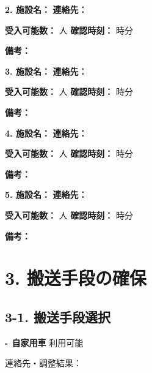 \documentclass[a4paper,12pt]{jarticle}
\newcommand{\checkbox}{$\square$\ }
\newcommand{\underlinespace}[1]{\underline{\hspace{#1}}}
\begin{document}
\vspace{4mm}

\textbf{2. 施設名：} \underlinespace{6cm} \quad \textbf{連絡先：} \underlinespace{4cm}

\quad \textbf{受入可能数：} \underlinespace{2cm}人 \quad \textbf{確認時刻：} \underlinespace{1cm}時\underlinespace{1cm}分

\quad \textbf{備考：} \underlinespace{10cm}

\vspace{4mm}

\textbf{3. 施設名：} \underlinespace{6cm} \quad \textbf{連絡先：} \underlinespace{4cm}

\quad \textbf{受入可能数：} \underlinespace{2cm}人 \quad \textbf{確認時刻：} \underlinespace{1cm}時\underlinespace{1cm}分

\quad \textbf{備考：} \underlinespace{10cm}

\vspace{4mm}

\textbf{4. 施設名：} \underlinespace{6cm} \quad \textbf{連絡先：} \underlinespace{4cm}

\quad \textbf{受入可能数：} \underlinespace{2cm}人 \quad \textbf{確認時刻：} \underlinespace{1cm}時\underlinespace{1cm}分

\quad \textbf{備考：} \underlinespace{10cm}

\vspace{4mm}

\textbf{5. 施設名：} \underlinespace{6cm} \quad \textbf{連絡先：} \underlinespace{4cm}

\quad \textbf{受入可能数：} \underlinespace{2cm}人 \quad \textbf{確認時刻：} \underlinespace{1cm}時\underlinespace{1cm}分

\quad \textbf{備考：} \underlinespace{10cm}

\section*{3. 搬送手段の確保}

\subsection*{3-1. 搬送手段選択}

\checkbox \textbf{自家用車} 利用可能 

\quad 連絡先・調整結果： \underlinespace{10cm}

\vspace{3mm}
\end{document}
